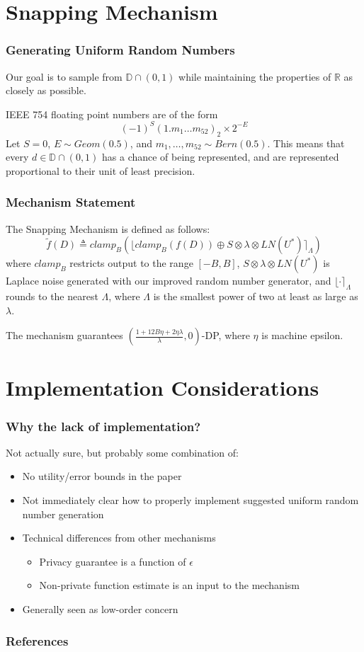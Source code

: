 \documentclass{beamer}
\begin{document}
\section{Snapping Mechanism}
\begin{frame}
    \frametitle{Generating Uniform Random Numbers}
    Our goal is to sample from $\mathbb{D} \cap (0,1)$ while maintaining the properties of $\mathbb{R}$ as closely as possible. \newline

    IEEE 754 floating point numbers are of the form
    \[ (-1)^S (1.m_{1} \hdots m_{52})_{2} \times 2^{-E} \]
    Let $S = 0$, $E \sim Geom(0.5)$, and $m_1, \hdots, m_{52} \sim Bern(0.5)$. This means that every $d \in \mathbb{D} \cap (0,1)$ has a chance of being represented, and are represented proportional to their unit of least precision.
\end{frame}

\begin{frame}
    \frametitle{Mechanism Statement}
    The Snapping Mechanism \cite{Mir2012} is defined as follows:
    \[ \tilde{f}(D) \triangleq clamp_{B} \left( \lfloor clamp_{B}(f(D)) \oplus S \otimes \lambda \otimes LN(U^*) \rceil_{\Lambda} \right) \]   
    where $clamp_{B}$ restricts output to the range $[-B, B]$, $S \otimes \lambda \otimes LN(U^*)$ is Laplace noise generated with our improved random number generator, and $\lfloor \cdot \rceil_{\Lambda}$ rounds to the nearest $\Lambda$, where $\Lambda$ is the smallest power of two at least as large as $\lambda$.
    
The mechanism guarantees $\left(\frac{1 + 12B \eta + 2\eta\lambda}{\lambda}, 0\right)$-DP, where $\eta$ is machine epsilon.
\end{frame}

\section{Implementation Considerations}
\begin{frame}
    \frametitle{Why the lack of implementation?}
    Not actually sure, but probably some combination of:
    \begin{itemize}
        \item No utility/error bounds in the paper
        \item Not immediately clear how to properly implement suggested uniform random number generation
        \item Technical differences from other mechanisms
            \begin{itemize}
                \item Privacy guarantee is a function of $\epsilon$
                \item Non-private function estimate is an input to the mechanism
            \end{itemize}
        \item Generally seen as low-order concern
    \end{itemize}
\end{frame}


\begin{frame}[allowframebreaks]
    \frametitle{References}
    
    
\end{frame}
\end{document}
